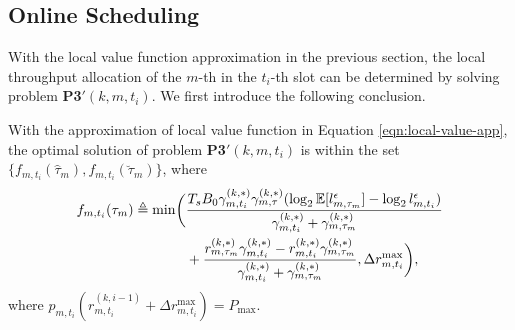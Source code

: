 \subsection{Online Scheduling}
\label{subsec:chapter2-local_opt}
With the local value function approximation in the previous section, the local throughput allocation of the $m$-th {\IAV} in the $t_i$-th slot can be determined by solving problem \textbf{P3$'(k,m,t_i)$}. We first introduce the following conclusion.
\begin{lemma}
    \label{lemma:local_approx_solution}
    With the approximation of local value function in Equation \eqref{eqn:local-value-app}, the optimal solution of problem \textbf{P3$'(k,m,t_i)$} is within the set $\{f_{m,t_i}(\hat{\tau}_m),f_{m,t_i}(\breve{\tau}_m) \}$, where
    \begin{align}
        f_{m,t_i}(\tau_m) \define
        \min\Paren{
            &\frac{
                T_s B_0 \gamma^{(k,*)}_{m,t_i} \gamma^{(k,*)}_{m,\tau} \paren{ \log_2{ \mathbb{E}[l^{\epsilon}_{m,\tau_m}] } - \log_2{l^{\epsilon}_{m,t_i}} } 
            }{
                \gamma^{(k,*)}_{m,t_i} + \gamma^{(k,*)}_{m,\tau_m}
            }
            \nonumber\\
            &+\frac{
                r^{(k,*)}_{m,\tau_m}\gamma^{(k,*)}_{m,t_i} - r^{(k,*)}_{m,t_i}\gamma^{(k,*)}_{m,\tau_m} 
            }{
                \gamma^{(k,*)}_{m,t_i} + \gamma^{(k,*)}_{m,\tau_m}
            },
            \Delta{r}^{\max}_{m,t_i}
        },
    \end{align}
    where $p_{m,t_i}( r^{(k,i-1)}_{m,t_i} + \Delta{r}^{\max}_{m,t_i} ) = P_{\max}$.
\end{lemma}
